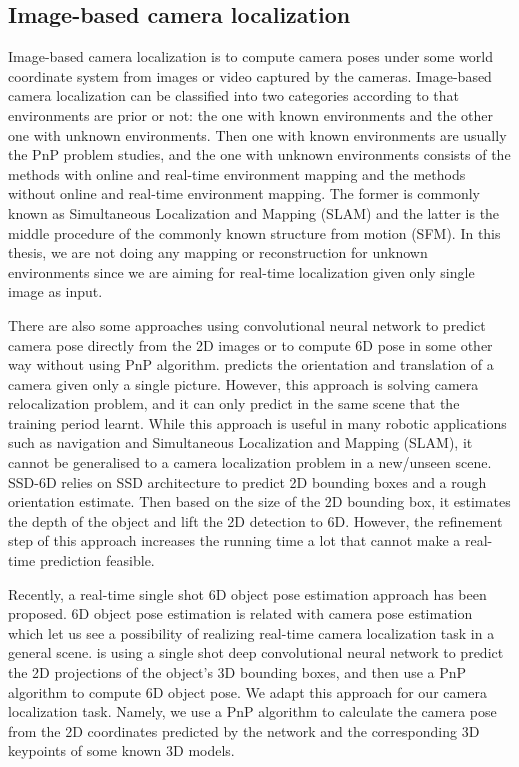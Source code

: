 \subsection{Image-based camera localization}

Image-based camera localization \cite{wu2018image} is to compute camera poses under some world coordinate system from images or video captured by the cameras. Image-based camera localization can be classified into two categories according to that environments are prior or not: the one with known environments and the other one with unknown environments. Then one with known environments are usually the PnP problem studies, and the one with unknown environments consists of the methods with online and real-time environment mapping and the methods without online and real-time environment mapping. The former is commonly known as Simultaneous Localization and Mapping (SLAM) and the latter is the middle procedure of the commonly known structure from motion (SFM). In this thesis, we are not doing any mapping or reconstruction for unknown environments since we are aiming for real-time localization given only single image as input.

There are also some approaches using convolutional neural network to predict camera pose directly from the 2D images or to compute 6D pose in some other way without using PnP algorithm. \cite{wu2017delving} predicts the orientation and translation of a camera given only a single picture. However, this approach is solving camera relocalization problem, and it can only predict in the same scene that the training period learnt. While this approach is useful in many robotic applications such as navigation and Simultaneous Localization and Mapping (SLAM), it cannot be generalised to a camera localization problem in a new/unseen scene. SSD-6D relies on SSD architecture to predict 2D bounding boxes and a rough orientation estimate. Then based on the size of the 2D bounding box, it estimates the depth of the object and lift the 2D detection to 6D. However, the refinement step of this approach increases the running time a lot that cannot make a real-time prediction feasible.

Recently, a real-time single shot 6D object pose estimation approach \cite{tekin2018real} has been proposed. 6D object pose estimation is related with camera pose estimation which let us see a possibility of realizing real-time camera localization task in a general scene. \cite{tekin2018real} is using a single shot deep convolutional neural network to predict the 2D projections of the object's 3D bounding boxes, and then use a PnP algorithm to compute 6D object pose. We adapt this approach for our camera localization task. Namely, we use a PnP algorithm to calculate the camera pose from the 2D coordinates predicted by the network and the corresponding 3D keypoints of some known 3D models.

